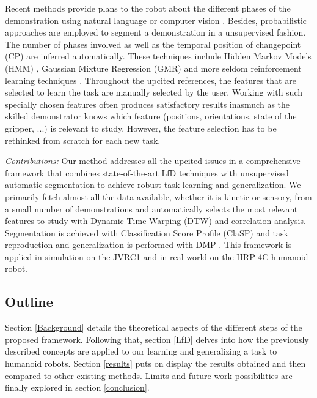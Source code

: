 \documentclass[conference]{IEEEtran}
\begin{document}
Recent methods provide plans to the robot about the different phases of the demonstration using natural language or computer vision \cite{caccavale_kinesthetic_2019} \cite{saran_enhancing_2019}. Besides, probabilistic approaches are employed to segment a demonstration in a unsupervised fashion. The number of phases involved as well as the temporal position of changepoint (CP) are inferred automatically. These techniques include Hidden Markov Models (HMM) \cite{niekum_learning_2015}, Gaussian Mixture Regression (GMR) \cite{calinon_learning_2010} \cite{calinon_learning_2007} and more seldom reinforcement learning techniques \cite{kroemer_towards_2015}. Throughout the upcited references, the features that are selected to learn the task are manually selected by the user. Working with such specially chosen features often produces satisfactory results inasmuch as the skilled demonstrator knows which feature (positions, orientations, state of the gripper, ...) is relevant to study. However, the feature selection has to be rethinked from scratch for each new task. \newline


\textit{Contributions:} 
Our method addresses all the upcited issues in a comprehensive framework that combines state-of-the-art LfD techniques with unsupervised automatic segmentation to achieve robust task learning and generalization. We primarily fetch almost all the data available, whether it is kinetic  or sensory, from a small number of demonstrations and automatically selects the most relevant features to study with Dynamic Time Warping (DTW) and correlation analysis. Segmentation is achieved with Classification Score Profile (ClaSP) \cite{clasp} and task reproduction and generalization is performed with DMP \cite{ijspeert_movement_2002} \cite{ijspeert_dynamical_2013}. This framework is applied in simulation on the JVRC1 and in real world on the HRP-4C humanoid robot.

\subsection{Outline}

Section \ref{Background} details the theoretical aspects of the different steps of the proposed framework. Following that, section \ref{LfD} delves into how the previously described concepts are applied to our learning and generalizing a task to humanoid robots. Section \ref{results} puts on display the results obtained and then compared to other existing methods. Limits and future work possibilities are finally explored in section \ref{conclusion}.
\end{document}
